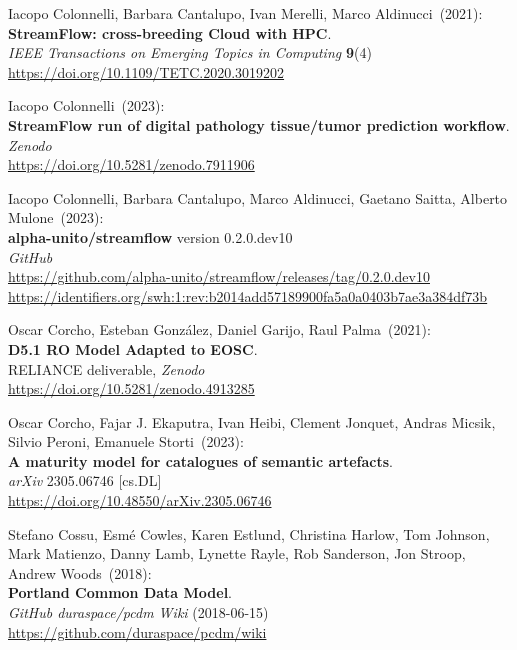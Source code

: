 \begin{thebibliography}{9}
Iacopo Colonnelli, Barbara Cantalupo, Ivan Merelli, Marco Aldinucci~(2021): \\
\textbf{StreamFlow: cross-breeding Cloud with HPC}.\\
\emph{IEEE Transactions on Emerging Topics in Computing} \textbf{9}(4)\\
\url{https://doi.org/10.1109/TETC.2020.3019202}

Iacopo Colonnelli~(2023): \\
\textbf{StreamFlow run of digital pathology tissue/tumor prediction workflow}.\\
\emph{Zenodo}\\
\url{https://doi.org/10.5281/zenodo.7911906}

Iacopo Colonnelli, Barbara Cantalupo, Marco Aldinucci, Gaetano Saitta, Alberto Mulone~(2023): \\
\textbf{alpha-unito/streamflow} version 0.2.0.dev10\\
\emph{GitHub}\\
\url{https://github.com/alpha-unito/streamflow/releases/tag/0.2.0.dev10}\\
\url{https://identifiers.org/swh:1:rev:b2014add57189900fa5a0a0403b7ae3a384df73b}

Oscar Corcho, Esteban González, Daniel Garijo, Raul Palma~(2021): \\
\textbf{D5.1 RO Model Adapted to EOSC}.\\
RELIANCE deliverable, \emph{Zenodo}\\
\url{https://doi.org/10.5281/zenodo.4913285}

Oscar Corcho, Fajar J. Ekaputra, Ivan Heibi, Clement Jonquet, Andras Micsik, Silvio Peroni, Emanuele Storti~(2023): \\
\textbf{A maturity model for catalogues of semantic artefacts}. \\
\emph{arXiv} 2305.06746 [cs.DL] \\
\url{https://doi.org/10.48550/arXiv.2305.06746}

Stefano Cossu, Esmé Cowles, Karen Estlund, Christina Harlow, Tom Johnson, Mark Matienzo, Danny Lamb, Lynette Rayle, Rob Sanderson, Jon Stroop, Andrew Woods~(2018): \\
\textbf{Portland Common Data Model}.\\
\emph{GitHub duraspace/pcdm Wiki} (2018-06-15)\\
\url{https://github.com/duraspace/pcdm/wiki}


\end{thebibliography}
